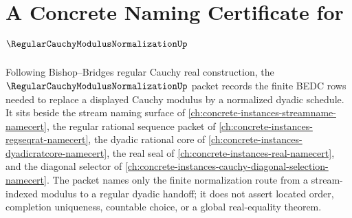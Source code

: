 \chapter{A Concrete Naming Certificate for $\RegularCauchyModulusNormalizationUp$}
\label{ch:concrete-instances-regular-cauchy-modulus-normalization-namecert}

Following Bishop--Bridges regular Cauchy real construction, the $\RegularCauchyModulusNormalizationUp$ packet records the finite BEDC rows needed to replace a displayed Cauchy modulus by a normalized dyadic schedule. It sits beside the stream naming surface of \autoref{ch:concrete-instances-streamname-namecert}, the regular rational sequence packet of \autoref{ch:concrete-instances-regseqrat-namecert}, the dyadic rational core of \autoref{ch:concrete-instances-dyadicratcore-namecert}, the real seal of \autoref{ch:concrete-instances-real-namecert}, and the diagonal selector of \autoref{ch:concrete-instances-cauchy-diagonal-selection-namecert}. The packet names only the finite normalization route from a stream-indexed modulus to a regular dyadic handoff; it does not assert located order, completion uniqueness, countable choice, or a global real-equality theorem.


